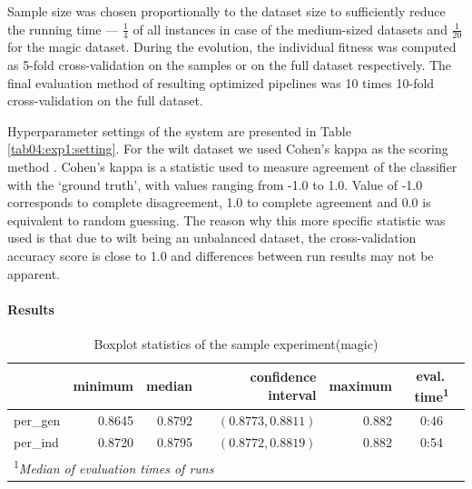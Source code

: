 Sample size was chosen proportionally to the dataset size to sufficiently
reduce the running time --- $\frac{1}{4}$ of all instances in case of the
medium-sized datasets and $\frac{1}{20}$ for the magic dataset. During the
evolution, the individual fitness was computed as 5-fold cross-validation on
the samples or on the full dataset respectively. The final evaluation method of
resulting optimized pipelines was 10 times 10-fold cross-validation on
the full dataset.

Hyperparameter settings of the system are presented in Table
\ref{tab04:exp1:setting}. For the wilt dataset we used Cohen's kappa
as the scoring method \citep{doi:10.1177/001316446002000104}. Cohen's kappa is a statistic used to measure agreement
of the classifier with the `ground truth', with values ranging from -1.0 to 1.0.
Value of -1.0 corresponds to complete disagreement, 1.0 to complete agreement
and 0.0 is equivalent to random guessing. The reason why this more specific
statistic was used is that due to wilt being an unbalanced dataset, the
cross-validation accuracy score is close to 1.0 and differences between
run results may not be apparent.

\paragraph{Results}

\begin{table}[ht]
\centering
\caption{Boxplot statistics of the sample experiment(magic)}\label{tab04:exp1:magboxstats}

\begin{tabular}{lrrrr|c}
\toprule
{} &  minimum &  median &  confidence interval &  maximum & eval.\,time\textsuperscript{1} \\
\midrule
per\_gen &   0.8645 &  0.8792 & $(0.8773,0.8811)$ &    0.882 & 0:46 \\
per\_ind &   0.8720 &  0.8795 & $(0.8772,0.8819)$ &    0.882 & 0:54 \\
\bottomrule

\multicolumn{6}{l}{\footnotesize\textsuperscript{1}\itshape Median of evaluation times of runs}

\end{tabular}

\end{table}


